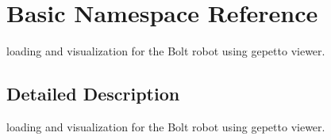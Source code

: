 \hypertarget{namespaceBasic}{}\section{Basic Namespace Reference}
\label{namespaceBasic}


loading and visualization for the Bolt robot using gepetto viewer.  




\subsection{Detailed Description}
loading and visualization for the Bolt robot using gepetto viewer. 